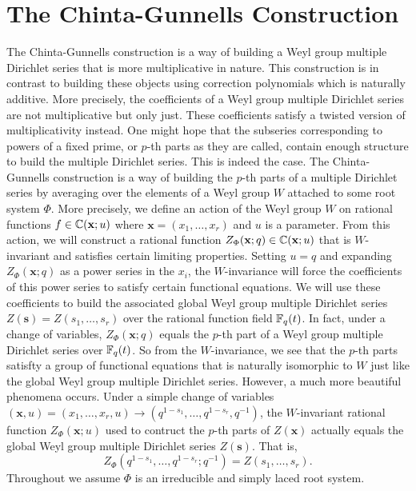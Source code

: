 \documentclass[12pt,reqno,oneside]{amsart}
\begin{document}
\section{The Chinta-Gunnells Construction}
    The Chinta-Gunnells construction is a way of building a Weyl group multiple Dirichlet series that is more multiplicative in nature. This construction is in contrast to building these objects using correction polynomials which is naturally additive. More precisely, the coefficients of a Weyl group multiple Dirichlet series are not multiplicative but only just. These coefficients satisfy a twisted version of multiplicativity instead. One might hope that the subseries corresponding to powers of a fixed prime, or $p$-th parts as they are called, contain enough structure to build the multiple Dirichlet series. This is indeed the case. The Chinta-Gunnells construction is a way of building the $p$-th parts of a multiple Dirichlet series by averaging over the elements of a Weyl group $W$ attached to some root system $\Phi$. More precisely, we define an action of the Weyl group $W$ on rational functions $f \in \mathbb{C}(\mathbf{x};u)$ where $\mathbf{x} = (x_{1},\ldots,x_{r})$ and $u$ is a parameter. From this action, we will construct a rational function $Z_{\Phi}(\mathbf{x};q) \in \mathbb{C}(\mathbf{x};u)$ that is $W$-invariant and satisfies certain limiting properties. Setting $u = q$ and expanding $Z_{\Phi}(\mathbf{x};q)$ as a power series in the $x_{i}$, the $W$-invariance will force the coefficients of this power series to satisfy certain functional equations. We will use these coefficients to build the associated global Weyl group multiple Dirichlet series $Z(\mathbf{s}) = Z(s_{1},\ldots,s_{r})$ over the rational function field $\mathbb{F}_{q}(t)$. In fact, under a change of variables, $Z_{\Phi}(\mathbf{x};q)$ equals the $p$-th part of a Weyl group multiple Dirichlet series over $\mathbb{F}_{q}(t)$. So from the $W$-invariance, we see that the $p$-th parts satisfty a group of functional equations that is naturally isomorphic to $W$ just like the global Weyl group multiple Dirichlet series. However, a much more beautiful phenomena occurs. Under a simple change of variables $(\mathbf{x},u) = (x_{1},\ldots,x_{r},u) \to (q^{1-s_{1}},\ldots,q^{1-s_{r}},q^{-1})$, the $W$-invariant rational function $Z_{\Phi}(\mathbf{x};u)$ used to contruct the $p$-th parts of $Z(\mathbf{x})$ actually equals the global Weyl group multiple Dirichlet series $Z(\mathbf{s})$. That is,
    \[
        Z_{\Phi}(q^{1-s_{1}},\ldots,q^{1-s_{r}};q^{-1}) = Z(s_{1},\ldots,s_{r}).
    \]
    Throughout we assume $\Phi$ is an irreducible and simply laced root system.
\end{document}
